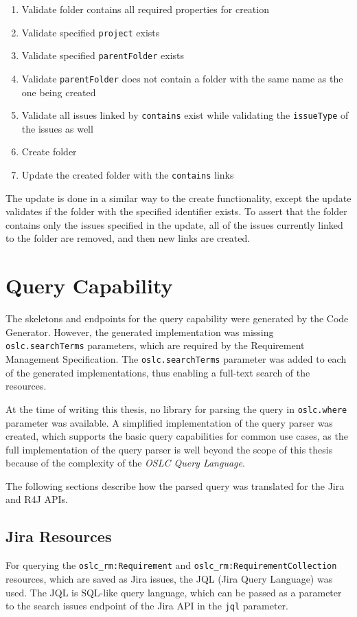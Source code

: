 \begin{enumerate}
  \item Validate folder contains all required properties for creation
  \item Validate specified \texttt{project} exists
  \item Validate specified \texttt{parentFolder} exists
  \item Validate \texttt{parentFolder} does not contain a folder with the same name as the one being created
  \item Validate all issues linked by \texttt{contains} exist while validating the \texttt{issueType} of the issues as well
  \item Create folder
  \item Update the created folder with the \texttt{contains} links
\end{enumerate}

The update is done in a similar way to the create functionality, except the update validates if the folder with the specified identifier exists. To assert that the folder contains only the issues specified in the update, all of the issues currently linked to the folder are removed, and then new links are created.

\section{Query Capability}
The skeletons and endpoints for the query capability were generated by the Code Generator. However, the generated implementation was missing \texttt{oslc.searchTerms} parameters, which are required by the Requirement Management Specification. The \texttt{oslc.searchTerms} parameter was added to each of the generated implementations, thus enabling a full-text search of the resources.

At the time of writing this thesis, no library for parsing the query in \texttt{oslc.where} parameter was available. A simplified implementation of the query parser was created, which supports the basic query capabilities for common use cases, as the full implementation of the query parser is well beyond the scope of this thesis because of the complexity of the \emph{OSLC Query Language}.

The following sections describe how the parsed query was translated for the Jira and R4J APIs.

\subsection*{Jira Resources}
For querying the \texttt{oslc\_rm:Requirement} and \texttt{oslc\_rm:RequirementCollection} resources, which are saved as Jira issues, the JQL (Jira Query Language) \cite{jql} was used. The JQL is SQL-like query language, which can be passed as a parameter to the search issues endpoint of the Jira API in the \texttt{jql} parameter.

